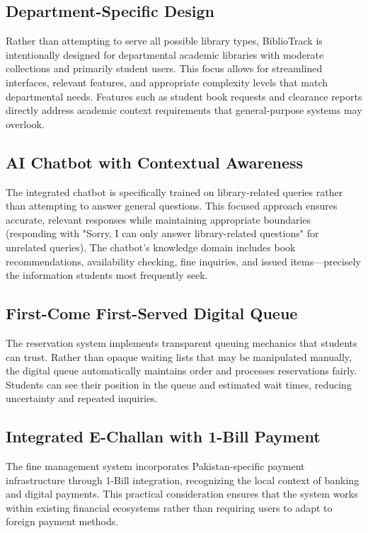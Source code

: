 \documentclass[12pt,a4paper]{report}
\begin{document}
\subsection{Department-Specific Design}
Rather than attempting to serve all possible library types, BiblioTrack is intentionally designed for departmental academic libraries with moderate collections and primarily student users. This focus allows for streamlined interfaces, relevant features, and appropriate complexity levels that match departmental needs. Features such as student book requests and clearance reports directly address academic context requirements that general-purpose systems may overlook.

\subsection{AI Chatbot with Contextual Awareness}

The integrated chatbot is specifically trained on library-related queries rather than attempting to answer general questions. This focused approach ensures accurate, relevant responses while maintaining appropriate boundaries (responding with "Sorry, I can only answer library-related questions" for unrelated queries). The chatbot's knowledge domain includes book recommendations, availability checking, fine inquiries, and issued items—precisely the information students most frequently seek.

\subsection{First-Come First-Served Digital Queue}

The reservation system implements transparent queuing mechanics that students can trust. Rather than opaque waiting lists that may be manipulated manually, the digital queue automatically maintains order and processes reservations fairly. Students can see their position in the queue and estimated wait times, reducing uncertainty and repeated inquiries.

\subsection{Integrated E-Challan with 1-Bill Payment}

The fine management system incorporates Pakistan-specific payment infrastructure through 1-Bill integration, recognizing the local context of banking and digital payments. This practical consideration ensures that the system works within existing financial ecosystems rather than requiring users to adapt to foreign payment methods.
\end{document}
